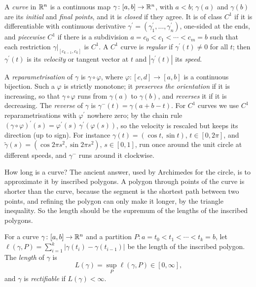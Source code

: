 \begin{definition}\label{real-analysis:definition-curve}
A \emph{curve} in $\mathbb{R}^n$ is a continuous map $\gamma \colon [a, b] \to \mathbb{R}^n$, with $a < b$; $\gamma(a)$ and $\gamma(b)$ are its \emph{initial} and \emph{final points}, and it is \emph{closed} if they agree. It is of
class $C^1$ if it is differentiable with continuous derivative $\gamma^{\prime} = (\gamma_1^{\prime}, \ldots, \gamma_n^{\prime})$, one-sided at the ends, and \emph{piecewise $C^1$} if there is a subdivision
$a = c_0 < c_1 < \cdots < c_m = b$ such that each restriction $\gamma|_{[c_{k-1}, c_k]}$ is $C^1$. A $C^1$ curve is \emph{regular} if $\gamma^{\prime}(t) \neq 0$ for all $t$; then $\gamma^{\prime}(t)$ is its
\emph{velocity} or tangent vector at $t$ and $|\gamma^{\prime}(t)|$ its \emph{speed}.
\end{definition}

A \emph{reparametrisation} of $\gamma$ is $\gamma \circ \varphi$, where $\varphi \colon [c, d] \to [a, b]$ is a continuous bijection. Such a $\varphi$ is strictly monotone; it \emph{preserves the orientation} if
it is increasing, so that $\gamma \circ \varphi$ runs from $\gamma(a)$ to $\gamma(b)$, and \emph{reverses} it if it is decreasing. The \emph{reverse} of $\gamma$ is $\gamma^-(t) = \gamma(a + b - t)$. For
$C^1$ curves we use $C^1$ reparametrisations with $\varphi^{\prime}$ nowhere zero; by the chain rule $(\gamma \circ \varphi)^{\prime}(s) = \varphi^{\prime}(s)\,\gamma^{\prime}(\varphi(s))$, so the velocity is
rescaled but keeps its direction (up to sign). For instance $\gamma(t) = (\cos t, \sin t)$, $t \in [0, 2\pi]$, and $\tilde\gamma(s) = (\cos 2\pi s^2, \sin 2\pi s^2)$, $s \in [0, 1]$, run once around the unit circle at
different speeds, and $\gamma^-$ runs around it clockwise.

How long is a curve? The ancient answer, used by Archimedes for the circle, is to approximate it by inscribed polygons. A polygon through points of the curve is shorter than the curve, because the
segment is the shortest path between two points, and refining the polygon can only make it longer, by the triangle inequality. So the length should be the supremum of the lengths of the inscribed
polygons.

\begin{definition}\label{real-analysis:definition-length}
For a curve $\gamma \colon [a, b] \to \mathbb{R}^n$ and a partition $P \colon a = t_0 < t_1 < \cdots < t_k = b$, let $\ell(\gamma, P) = \sum_{i=1}^k|\gamma(t_i) - \gamma(t_{i-1})|$ be the length of the inscribed polygon. The
\emph{length} of $\gamma$ is
\[
L(\gamma) = \sup_P\ell(\gamma, P) \in [0, \infty],
\]
and $\gamma$ is \emph{rectifiable} if $L(\gamma) < \infty$.
\end{definition}

